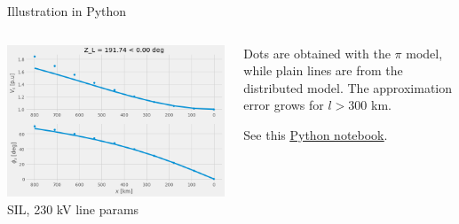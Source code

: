 \begin{frame}{Illustration in Python}

\begin{columns}
    \begin{column}{0.55\textwidth}
    \begin{center}
        \includegraphics[width=\textwidth]{images/pi_model_voltage.png}
        \small{SIL, 230 kV line params}
    \end{center}
    \end{column}
    \begin{column}{0.4\textwidth}
    Dots are obtained with the $\pi$ model, while plain lines are from the distributed model. The approximation error grows for $l > 300$ km.

    See this \href{https://colab.research.google.com/drive/1FDHjHhW1a6JECWwfznBeP2T5-M9UaJn8?usp=sharing}{\underline{Python notebook}}.
    \end{column}
\end{columns}
\end{frame}

